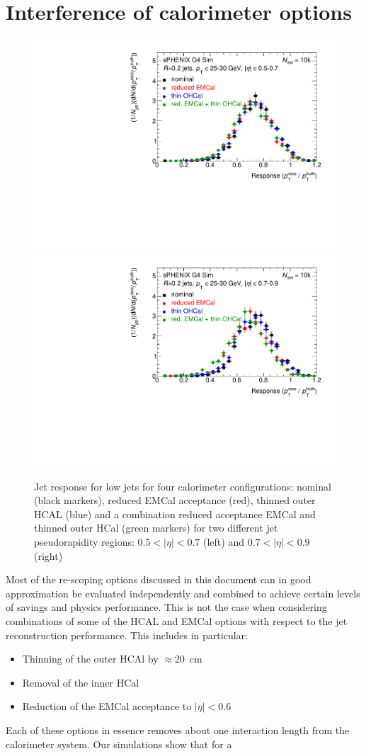 \section{Interference of calorimeter options}
\begin{figure}[hbt]
  \centering
  \includegraphics[width=0.4\linewidth]{figs/h1_etascan_response_ETA1}
  \hspace{0.1\linewidth}  
  \includegraphics[width=0.4\linewidth]{figs/h1_etascan_response_ETA2}
  \caption{Jet response for low \pt jets for four calorimeter configurations:
   nominal (black markers), reduced EMCal acceptance (red), thinned outer HCAL (blue) and a combination
   reduced acceptance EMCal and thinned outer HCal (green markers) for two different jet pseudorapidity regions: $0.5 < |\eta| < 0.7$ (left) and 
$0.7 < |\eta| < 0.9$ (right) }
  \label{fig:JetResponse25GeV_CaloStackVariants_Nevt20k}
\end{figure}
Most of the re-scoping options discussed in this document can in good approximation be evaluated independently and combined to achieve certain levels of savings 
and physics performance. This is not the case when considering combinations of some of the HCAL and EMCal options with respect to the 
jet reconstruction performance. This includes in particular:
\begin{itemize}
\item Thinning of the outer HCAl by $\approx 20$~cm
\item Removal of the inner HCal
\item Reduction of the EMCal acceptance to $|\eta| < 0.6$
\end{itemize}
Each of these options in essence removes about one interaction length from the calorimeter system. Our simulations show that for a 

